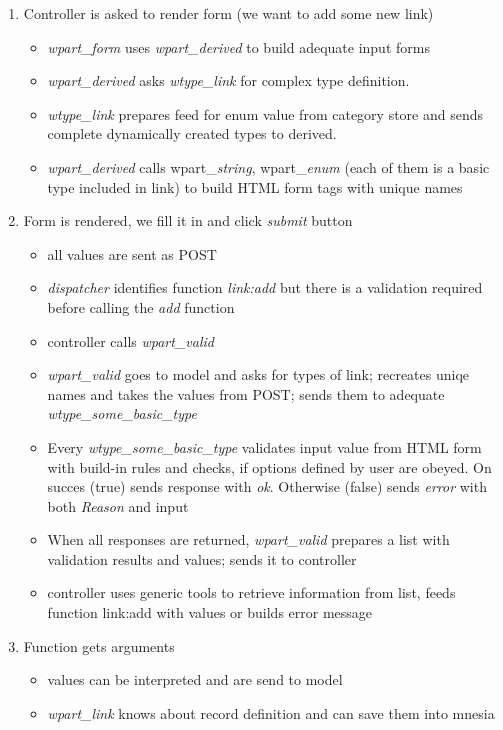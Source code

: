 \begin{enumerate} 
\item Controller is asked to render form (we want to add some new link)

  \begin{itemize}
     \item \textit{wpart\_form} uses \textit{wpart\_derived} to build adequate input
       forms
     \item  \textit{wpart\_derived} asks \textit{wtype\_link} for complex type definition.
     \item  \textit{wtype\_link} prepares feed for enum value from category store
       and sends complete dynamically created types to derived. 
     \item  \textit{wpart\_derived} calls wpart\_\textit{string}, wpart\_\textit{enum} (each of them is a basic
       type included in link) to build HTML form tags with unique names
  \end{itemize}

\item Form is rendered, we fill it in and click {\it submit} button

  \begin{itemize}
     \item all values are sent as POST 
     \item \textit{dispatcher} identifies function \emph{link:add} but
       there is a validation required before calling the \emph{add} function
     \item  controller calls \textit{wpart\_valid}
     \item  \textit{wpart\_valid} goes to model and asks for types of link;
       recreates uniqe names and takes the values from POST; sends them to adequate
       \textit{wtype\_some\_basic\_type}
     \item Every \textit{wtype\_some\_basic\_type} validates input value from
       HTML form with build-in rules and checks, if options defined by user are
       obeyed. On succes (true) sends response with {\it ok}. Otherwise (false) 
       sends {\it error} with both {\it Reason} and input
     \item When all responses are returned, \textit{wpart\_valid} prepares a
       list with validation results and values; sends it to controller
     \item controller uses generic tools to retrieve information from list,
       feeds function link:add with values or builds error message
  \end{itemize}

\item Function gets arguments
  \begin{itemize}
     \item values can be interpreted and are send to model
     \item  \textit{wpart\_link} knows about record definition and can save them into
       mnesia
  \end{itemize}

\end{enumerate}

